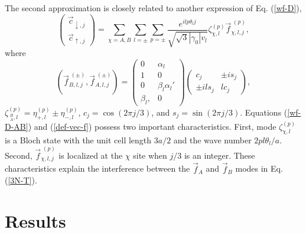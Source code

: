 \documentclass{jpsj3}
\begin{document}
The second approximation is closely related
to another expression of Eq. (\ref{wf-D}),
\begin{equation}
\left(
\begin{array}{c}
\vec{c}_{\downarrow,j}
\\
\vec{c}_{\uparrow,j}
\end{array}
\right)
=
\sum_{\chi =A,B}\sum_{l=\pm}\sum_{p=\pm}
\frac{e^{ilp\theta_l j}}
{\sqrt{\sqrt{3}|\gamma_0| v_l}}
\zeta^{(p)}_{\chi,l}
\vec{f}^{\;(p)}_{\chi,l,j},
\label{wf-D-AB}
\end{equation}
where
\begin{equation}
\left(
\vec{f}_{B,l,j}^{\;(\pm)},
\vec{f}_{A,l,j}^{\;(\pm)}
\right)
=
\left(
\begin{array}{cc}
0& \alpha_l
\\
1& 0
\\
0& \beta_l\alpha_l'
\\
\beta_l,& 0
\end{array}
\right)
\left(
\begin{array}{cc}
c_j& \pm is_j
\\
\pm ils_j & lc_j
\end{array}
\right),
\label{def-vec-f}
\end{equation}
$\zeta_{\;_A^B,l}^{(p)}=\eta_{+,l}^{(p)}\pm\eta_{-,l}^{(p)}$,
$c_j=\cos(2\pi j/3)$, and $s_j=\sin(2\pi j/3)$.
Equations (\ref{wf-D-AB}) and (\ref{def-vec-f}) possess two important
characteristics.
First, mode $\zeta_{\chi,l}^{(p)}$ is a Bloch
state with the unit cell length $3a/2$ and the wave number $2 pl\theta_l/a$.
Second, $\vec{f}_{\chi,l,j}^{\;(p)}$ 
is localized at the $\chi$ site when $j/3$ is an integer.
These characteristics explain
the interference between the $\vec{f}_A$ and $\vec{f}_{B}$
modes in Eq. (\ref{3N-T}).



\section{ Results}
\end{document}
